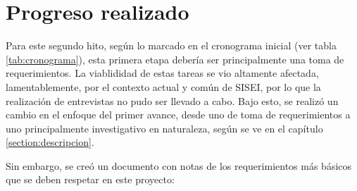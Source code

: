 \section{Progreso realizado}

Para este segundo hito, según lo marcado en el cronograma inicial (ver tabla \ref{tab:cronograma}), esta primera etapa debería ser principalmente una toma de requerimientos. La viablididad de estas tareas se vio altamente afectada, lamentablemente, por el contexto actual y común de SISEI, por lo que la realización de entrevistas no pudo ser llevado a cabo. Bajo esto, se realizó un cambio en el enfoque del primer avance, desde uno de toma de requerimientos a uno principalmente investigativo en naturaleza, según se ve en el capítulo \ref{section:descripcion}.

Sin embargo, se creó un documento con notas de los requerimientos más básicos que se deben respetar en este proyecto:

